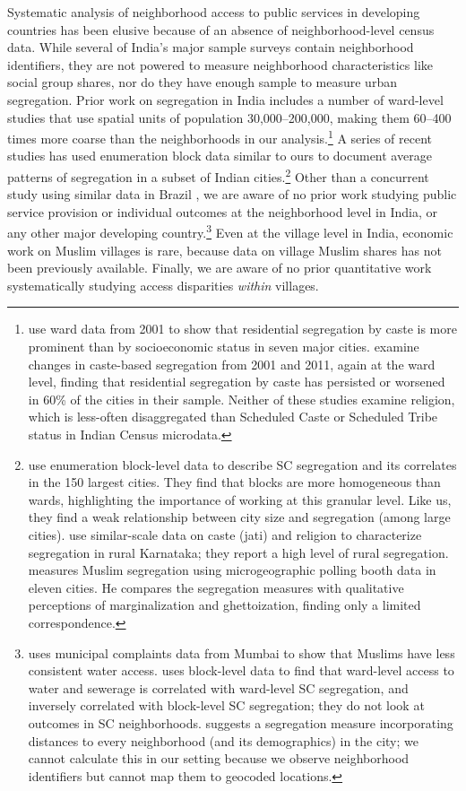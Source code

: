 \documentclass[12pt]{article}
\begin{document}
Systematic analysis of neighborhood access to public services in developing countries has been elusive because of an absence of neighborhood-level census data. While several of India's major sample surveys contain neighborhood identifiers, they are not powered to measure neighborhood characteristics like social group shares, nor do they have enough sample to measure urban segregation. Prior work on segregation in India includes a number of ward-level studies that use spatial units of population 30,000--200,000, making them 60--400 times more coarse than the neighborhoods in our analysis.\footnote{\citet{VithayathilTrinaandSingh2012SpacesCities} use ward data from 2001 to show that residential segregation by caste is more prominent than by socioeconomic status in seven major cities. \citet{Singh2019RecastingIndia} examine changes in caste-based segregation from 2001 and 2011, again at the ward level, finding that residential segregation by caste has persisted or worsened in 60\% of the cities in their sample. Neither of these studies examine religion, which is less-often disaggregated than Scheduled Caste or Scheduled Tribe status in Indian Census microdata.} A series of recent studies has used enumeration block data similar to ours to document average patterns of segregation in a subset of Indian cities.\footnote{\citet{bharathi2021fractal} use enumeration block-level data to describe SC segregation and its correlates in the 150 largest cities. They find that blocks are more homogeneous than wards, highlighting the importance of working at this granular level. Like us, they find a weak relationship between city size and segregation (among large cities). \citet{bharathi2021cordon} use similar-scale data on caste (jati) and religion to characterize segregation in rural Karnataka; they report a high level of rural segregation. \citet{Susewind2017MuslimsGhetto} measures Muslim segregation using microgeographic polling booth data in eleven cities. He compares the segregation measures with qualitative perceptions of marginalization and ghettoization, finding only a limited correspondence.} Other than a concurrent study using similar data in Brazil \citep{harari2024}, we are aware of no prior work studying public service provision or individual outcomes at the neighborhood level in India, or any other major developing country.\footnote{\citet{kumar2025} uses municipal complaints data from Mumbai to show that Muslims have less consistent water access. \citet{bharathi2022services} uses block-level data to find that ward-level access to water and sewerage is correlated with ward-level SC segregation, and inversely correlated with block-level SC segregation; they do not look at outcomes in SC neighborhoods. \citet{harari2024} suggests a segregation measure incorporating distances to every neighborhood (and its demographics) in the city; we cannot calculate this in our setting because we observe neighborhood identifiers but cannot map them to geocoded locations.} Even at the village level in India, economic work on Muslim villages is rare, because data on village Muslim shares has not been previously available. Finally, we are aware of no prior quantitative work systematically studying access disparities \textit{within} villages.
\end{document}
